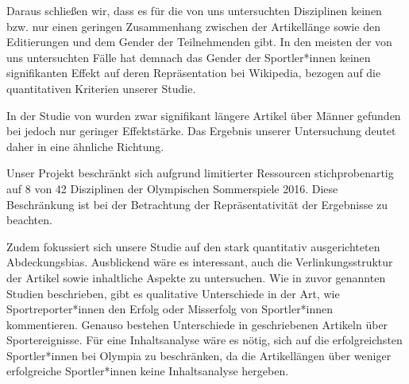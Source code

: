 \documentclass[11pt]{article}
\begin{document}
Daraus schließen wir, dass es für die von uns untersuchten Disziplinen keinen bzw. nur einen geringen Zusammenhang zwischen der Artikellänge sowie den Editierungen und dem Gender der Teilnehmenden gibt. In den meisten der von uns untersuchten Fälle hat demnach das Gender der Sportler*innen keinen signifikanten Effekt auf deren Repräsentation bei Wikipedia, bezogen auf die quantitativen Kriterien unserer Studie.

In der Studie von \textcite{GraellsGarrido2015} wurden zwar signifikant längere Artikel über Männer gefunden bei jedoch nur geringer Effektstärke. Das Ergebnis unserer Untersuchung deutet daher in eine ähnliche Richtung.

Unser Projekt beschränkt sich aufgrund limitierter Ressourcen stichprobenartig auf 8 von 42 Disziplinen der Olympischen Sommerspiele 2016. Diese Beschränkung ist bei der Betrachtung der Repräsentativität der Ergebnisse zu beachten.

Zudem fokussiert sich unsere Studie auf den stark quantitativ ausgerichteten Abdeckungsbias. Ausblickend wäre es interessant, auch die Verlinkungsstruktur der Artikel sowie inhaltliche Aspekte zu untersuchen. Wie in zuvor genannten Studien beschrieben, gibt es qualitative Unterschiede in der Art, wie Sportreporter*innen den Erfolg oder Misserfolg von Sportler*innen kommentieren. Genauso bestehen Unterschiede in geschriebenen Artikeln über Sportereignisse. Für eine Inhaltsanalyse wäre es nötig, sich auf die erfolgreichsten Sportler*innen bei Olympia zu beschränken, da die Artikellängen über weniger erfolgreiche Sportler*innen keine Inhaltsanalyse hergeben.

\printbibliography
\end{document}
